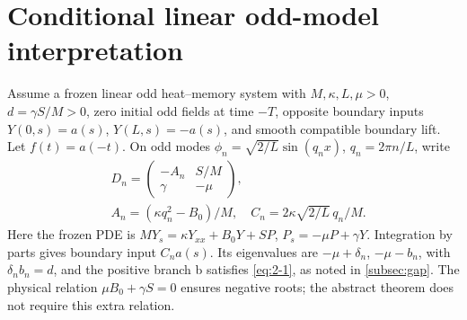 \section{Conditional linear odd-model interpretation}\label{sec:model}
Assume a frozen linear odd heat--memory system with \(M,\kappa,L,\mu>0\), \(d=\gamma S/M>0\), zero initial odd fields at time \(-T\), opposite boundary inputs \(Y(0,s)=a(s)\), \(Y(L,s)=-a(s)\), and smooth compatible boundary lift. Let \(f(t)=a(-t)\). On odd modes \(\phi_n=\sqrt{2/L}\sin(q_nx)\), \(q_n=2\pi n/L\), write
\begin{equation}\label{eq:4-1}
\begin{aligned}
&D_n=\begin{pmatrix}-A_n&S/M\\\gamma&-\mu\end{pmatrix},\\
&
A_n=(\kappa q_n^2-B_0)/M,\quad C_n=2\kappa\sqrt{2/L}\,q_n/M.
\end{aligned}
\end{equation}
Here the frozen PDE is \(M Y_s=\kappa Y_{xx}+B_0Y+SP\), \(P_s=-\mu P+\gamma Y\). Integration by parts gives boundary input \(C_na(s)\). Its eigenvalues are \(-\mu+\delta_n\), \(-\mu-b_n\), with \(\delta_nb_n=d\), and the positive branch b satisfies \eqref{eq:2-1}, as noted in \cref{subsec:gap}. The physical relation \(\mu B_0+\gamma S=0\) ensures negative roots; the abstract theorem does not require this extra relation.

